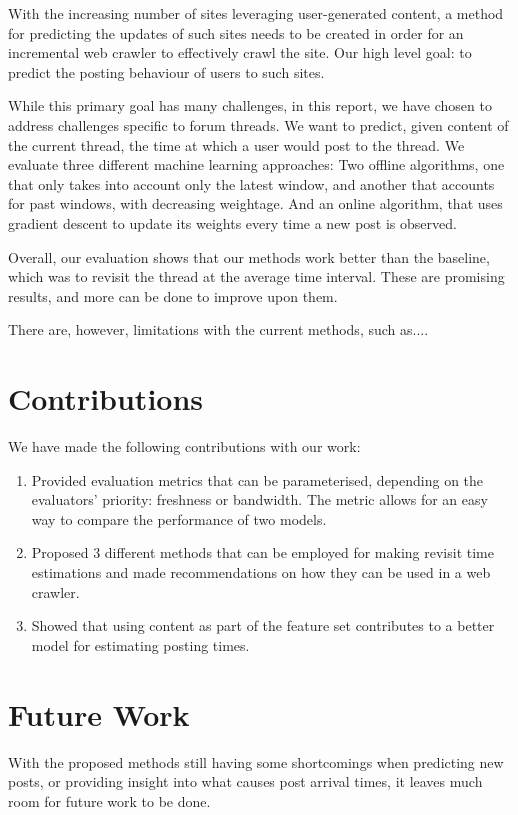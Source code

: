 With the increasing number of sites leveraging user-generated content, a method 
for predicting the updates of such sites needs to be created in order for an 
incremental web crawler to effectively crawl the site. Our high level goal: to 
predict the posting behaviour of users to such sites.

While this primary goal has many challenges, in this report, we have chosen to 
address challenges specific to forum threads. We want to predict, given content 
of the current thread, the time at which a user would post to the thread. We 
evaluate three different machine learning approaches: Two offline algorithms, 
one that only takes into account only the latest window, and another that 
accounts for past windows, with decreasing weightage. And an online algorithm, 
that uses gradient descent to update its weights every time a new post is 
observed.

Overall, our evaluation shows that our methods work better than the baseline, 
which was to revisit the thread at the average time interval. These are 
promising results, and more can be done to improve upon them. 

There are, however, limitations with the current methods, such as....


\section{Contributions}
We have made the following contributions with our work:
\begin{enumerate}
\item Provided evaluation metrics that can be parameterised, depending on the 
	evaluators' priority: freshness or bandwidth. The metric allows for an easy 
	way to compare the performance of two models.
\item Proposed 3 different methods that can be employed for making revisit time 
	estimations and made recommendations on how they can be used in a web 
	crawler.
\item Showed that using content as part of the feature set contributes to a 
	better model for estimating posting times.
\end{enumerate}

\section{Future Work}

With the proposed methods still having some shortcomings when predicting new 
posts, or providing insight into what causes post arrival times, it leaves much 
room for future work to be done.



